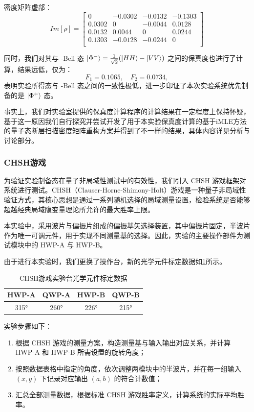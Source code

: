 密度矩阵虚部：
\[
Im[\rho]=\begin{bmatrix}
	0 & -0.0302 & -0.0132 & -0.1303 \\
	0.0302 & 0 & -0.0044 & 0.0128 \\
	0.0132 & 0.0044 & 0 & 0.0244 \\
	0.1303 & -0.0128 & -0.0244 & 0 \\
\end{bmatrix}
\]

同时，我们对其与 -Bell 态 $\ket{\Phi^-} = \frac{1}{\sqrt{2}}(\ket{HH} - \ket{VV})$ 之间的保真度也进行了计算，结果远低，仅为：
\[
F_1 = 0.1065,\quad F_2 = 0.0734,
\]
表明实验所得态与 -Bell 态之间的一致性极低，进一步印证了本次实验系统优先制备的是 $\ket{\Phi^+}$ 态。

事实上，我们对实验室提供的保真度计算程序的计算结果在一定程度上保持怀疑，基于这一原因我们自行探究并尝试开发了用于本实验保真度计算的基于iMLE方法的量子态断层扫描密度矩阵重构方案并得到了不一样的结果，具体内容详见分析与讨论部分。

\subsubsection{CHSH游戏}
为验证实验制备态在量子非局域性测试中的有效性，我们引入 CHSH 游戏框架对系统进行测试。CHSH（Clauser-Horne-Shimony-Holt）游戏是一种量子非局域性验证方式，其核心思想是通过一系列随机选择的局域测量设置，检验系统是否能够超越经典局域隐变量理论所允许的最大胜率上限。

本实验中，采用波片与偏振片组成的偏振基矢选择装置，其中偏振片固定，半波片作为唯一可调元件，用于实现不同测量基的选择。因此，实验的主要操作部件为测试模块中的 HWP-A 与 HWP-B。

由于进行本实验时，我们更换了操作台，新的光学元件标定数据如\cref{tab4}所示。

\begin{table}[h!]
	\centering
	\begin{tabular}{|c|c|c|c|}
		\hline
		\textbf{HWP-A} & \textbf{QWP-A} & \textbf{HWP-B} & \textbf{QWP-B} \\ \hline
		315° & 260° & 226° & 215° \\ \hline
	\end{tabular}
	\caption{CHSH游戏实验台光学元件标定数据}
	\label{tab4}
\end{table}

实验步骤如下：
\begin{enumerate}
	\item 根据 CHSH 游戏的测量方案，构造测量基与输入输出对应关系，并计算 HWP-A 和 HWP-B 所需设置的旋转角度；
	\item 按照数据表格中指定的角度，依次调整两模块中的半波片，并在每一组输入 $(x, y)$ 下记录对应输出 $(a, b)$ 的符合计数值；
	\item 汇总全部测量数据，根据标准 CHSH 游戏胜率定义，计算系统的实际平均胜率。
\end{enumerate}

